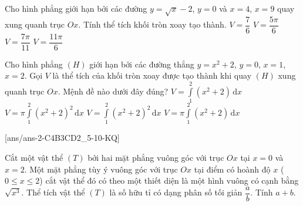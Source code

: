 	\begin{ex}%
		Cho hình phẳng giới hạn bởi các đường $y=\sqrt{x}-2$, $y=0$ và $x=4$, $x=9$ quay xung quanh trục $Ox$. Tính thể tích khối tròn xoay tạo thành.
		\choice
		{$V=\dfrac{7}{6}$}
		{$V=\dfrac{5\pi}{6}$}
		{$V=\dfrac{7\pi}{11}$}
		{\True $V=\dfrac{11\pi}{6}$}
	\end{ex}
	
	\begin{ex}%
		Cho hình phẳng $(H)$ giới hạn bởi các đường thẳng $y=x^2+2$, $y=0$, $x=1$, $x=2$. Gọi $V$ là thể tích của khối tròn xoay được tạo thành khi quay $(H)$ xung quanh trục $Ox$. Mệnh đề nào dưới đây đúng?
		\choice
		{$V=\displaystyle\int\limits_1^2\left(x^2+2\right)\mathrm{\,d}x$}
		{\True $V=\pi\displaystyle\int\limits_1^2\left(x^2+2\right)^2\mathrm{\,d}x$}
		{$V=\displaystyle\int\limits_1^2\left(x^2+2\right)^2\mathrm{\,d}x$}
		{$V=\pi\displaystyle\int\limits_1^2\left(x^2+2\right)\mathrm{\,d}x$}
	\end{ex}

[ans/ans-2-C4B3CD2_5-10-KQ]
\TNSA
	
	\begin{ex}%
		Cắt một vật thể $(T)$ bởi hai mặt phẳng vuông góc với trục $Ox$ tại $x=0$ và $x=2$. Một mặt phẳng tùy ý vuông góc với trục $Ox$ tại điểm có hoành độ $x$ ($0\le x\le 2$) cắt vật thể đó có theo một thiết diện là một hình vuông có cạnh bằng $\sqrt{x^3}$. Thể tích vật thể $(T)$ là số hữu tỉ có dạng phân số tối giản $\dfrac{a}{b}$. Tính $a+b$.
	\end{ex}
	
